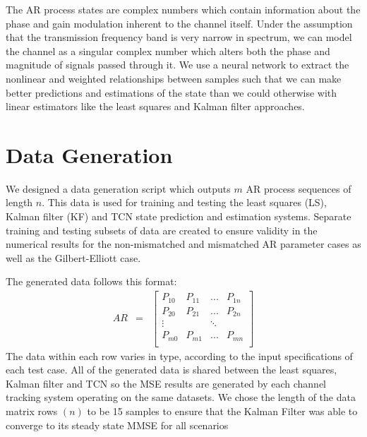 \documentclass[twocolumn,letterpaper]{IEEEAerospaceCLS}  %
\begin{document}
The AR process states are complex numbers which contain information about the phase and gain modulation inherent to the channel itself. Under the assumption that the transmission frequency band is very narrow in spectrum, we can model the channel as a singular complex number which alters both the phase and magnitude of signals passed through it. We use a neural network to extract the nonlinear and weighted relationships between samples such that we can make better predictions and estimations of the state than we could otherwise with linear estimators like the least squares and Kalman filter approaches. 


\section{Data Generation}

\label{sec:dgen}

We designed a data generation script which 
outputs %
$m$ AR process sequences of length $n$. This data is used for training and testing the least squares (LS), Kalman filter (KF) and TCN state prediction and estimation systems. Separate training and testing subsets of data are created to ensure validity in the numerical results for the non-mismatched and mismatched AR parameter cases as well as the Gilbert-Elliott case.

The generated data follows this format:
\begin{eqnarray*}
AR&=&\begin{bmatrix} 
P_{10} & P_{11} & ... & P_{1n} \\
P_{20} & P_{21} & ... & P_{2n} \\
\vdots &  & \ddots &  \\
P_{m0} & P_{m1} & ... & P_{mn} \\
\end{bmatrix}
\end{eqnarray*}
The data within each row varies in type, according to the input specifications of each test case. All of the generated data is shared between the least squares, Kalman filter and TCN so the MSE results are generated by each channel tracking system operating on the same datasets. We chose the length of the data matrix rows $(n)$ to be 15 samples 
to ensure that the Kalman Filter was able to converge to its steady state MMSE for all scenarios
 
\end{document}
